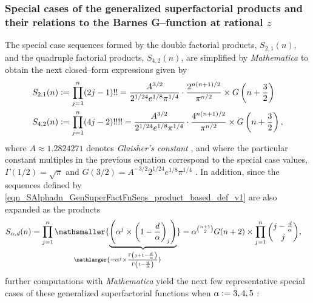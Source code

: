 \documentclass[12pt,reqno]{article}
\numberwithin{sfootnote}{section}
\numberwithin{equation}{section}
\theoremstyle{DefaultTheoremStyle}
\theoremstyle{definition}
\newcommand{\cf}[0]{cf.\ }
\newcommand{\defequals}{\ensuremath{\vcentcolon=}}
\newcommand{\undersetbrace}[2]{\ensuremath{\underset{\mathlarger{#1}}{\mathsmaller{\underbrace{#2}}}}}
\newcommand{\Mm}[0]{\emph{Mathematica}}
\newcommand{\Pochhammer}[2]{\ensuremath{\left(#1\right)_{#2}}}
\begin{document}
\subsubsection{Special cases of the 
               generalized superfactorial products and their relations to the 
               Barnes G--function at rational $z$} 
The special case sequences formed by the double factorial products, 
$S_{2,1}(n)$, and the quadruple factorial products, $S_{4,2}(n)$, 
are simplified by \Mm{} to obtain the next 
closed--form expressions given by 
\begin{align*} 
S_{2,1}(n) & \defequals \prod_{j=1}^{n} (2j-1)!! = 
     \frac{A^{3/2}}{2^{1/24} e^{1/8} \pi^{1/4}} \cdot 
     \frac{2^{n(n+1)/2}}{\pi^{n/2}} \times 
     G\left(n + \frac{3}{2}\right) \\ 
S_{4,2}(n) & \defequals \prod_{j=1}^{n} (4j-2)!!!! = 
     \frac{A^{3/2}}{2^{1/24} e^{1/8} \pi^{1/4}} \cdot 
     \frac{4^{n(n+1)/2}}{\pi^{n/2}} \times 
     G\left(n + \frac{3}{2}\right), 
\end{align*} 
where $A \approx 1.2824271$ denotes \emph{Glaisher's constant} 
\citep[\S 5.17]{NISTHB}, and where the particular constant multiples 
in the previous equation correspond to the special case values, 
$\Gamma(1/2) = \sqrt{\pi}$ and 
$G(3/2) = A^{-3/2} 2^{1/24} e^{1/8} \pi^{1/4}$ 
\citep{CONTRIB-THEORY-BARNESGFN}. 
In addition, 
since the sequences defined by 
\eqref{eqn_SAlphadn_GenSuperFactFnSeqs_product_based_def_v1} 
are also expanded as the products 
\begin{align*} 
S_{\alpha,d}(n) & = 
     \prod_{j=1}^{n} 
     \undersetbrace{= \alpha^{j} \times 
     \frac{\Gamma\left(j+1-\frac{d}{\alpha}\right)}{ 
     \Gamma\left(1-\frac{d}{\alpha}\right)}}{
     \left( 
     \alpha^{j} \times \Pochhammer{1 - \frac{d}{\alpha}}{j} 
     \right) 
     } = 
     \alpha^{\binom{n+1}{2}} G(n+2) \times 
     \prod_{j=1}^{n} \binom{j-\frac{d}{\alpha}}{j}, 
\end{align*} 
further computations with \Mm{} yield the next 
few representative special cases of these generalized superfactorial 
functions when $\alpha \defequals 3, 4, 5$
\citep[\cf \S 2]{CONTRIB-THEORY-BARNESGFN}: 
\end{document}
